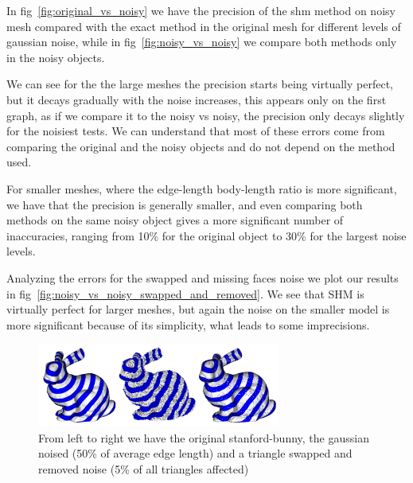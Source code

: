 \documentclass[sigconf]{acmart}
\begin{document}
In fig~\ref{fig:original_vs_noisy} we have the precision of the shm method on noisy mesh compared with the exact method in the original mesh for
different levels of gaussian noise, while in fig~\ref{fig:noisy_vs_noisy} we compare both methods only in the noisy objects.

We can see for the the large meshes the precision starts being virtually perfect, but it
decays gradually with the noise increases, this appears only on the first graph, as if we compare it to the noisy vs noisy, the precision
only decays slightly for the noisiest tests. We can understand that most of these errors come from comparing the original and the noisy objects
and do not depend on the method used.

For smaller meshes, where the edge-length body-length ratio is more significant, we have that the precision is generally smaller,
and even comparing both methods on the same noisy object gives a more significant number of inaccuracies, ranging from 10\% for the
original object to 30\% for the largest noise levels.

Analyzing the errors for the swapped and missing faces noise we plot our results
in fig~\ref{fig:noisy_vs_noisy_swapped_and_removed}. We see that SHM is virtually perfect
for larger meshes, but again the noise on the smaller model is more significant because
of its simplicity, what leads to some imprecisions. 

\begin{figure}
  \centering
  \includegraphics[width=8cm]{all_bunnies.png}
  \caption{From left to right we have the original stanford-bunny, the gaussian noised (50\% of average edge length) and a triangle swapped and removed noise (5\% of all triangles affected)}
  \label{fig:all_bunnies}
\end{figure}
\end{document}

